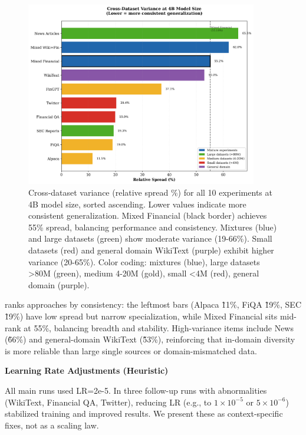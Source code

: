 \begin{figure}[h]
\centering
\includegraphics[width=0.9\textwidth]{figures/bar_variance.png}
\caption[Cross-Dataset Variance Comparison]{Cross-dataset variance (relative spread \%) for all 10 experiments at 4B model size, sorted ascending. Lower values indicate more consistent generalization. Mixed Financial (black border) achieves 55\% spread, balancing performance and consistency. Mixtures (blue) and large datasets (green) show moderate variance (19-66\%). Small datasets (red) and general domain WikiText (purple) exhibit higher variance (20-65\%). Color coding: mixtures (blue), large datasets >80M (green), medium 4-20M (gold), small <4M (red), general domain (purple).}
\label{fig:bar_variance}
\end{figure}

 ranks approaches by consistency: the leftmost bars (Alpaca \~11\%, FiQA \~19\%, SEC \~19\%) have low spread but narrow specialization, while Mixed Financial sits mid-rank at 55\%, balancing breadth and stability. High-variance items include News (\~66\%) and general-domain WikiText (\~53\%), reinforcing that in-domain diversity is more reliable than large single sources or domain-mismatched data.

\textbf{Learning Rate Adjustments (Heuristic)}

All main runs used LR=2e-5. In three follow-up runs with abnormalities (WikiText, Financial QA, Twitter), reducing LR (e.g., to $1\times10^{-5}$ or $5\times10^{-6}$) stabilized training and improved results. We present these as context-specific fixes, not as a scaling law.

